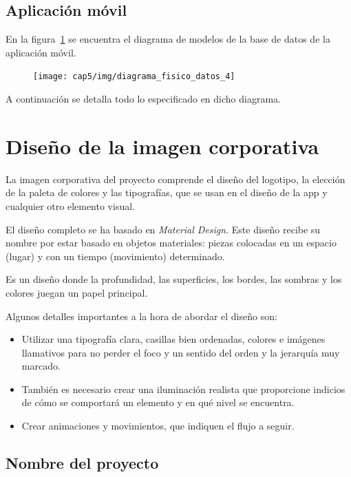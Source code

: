 \subsection{Aplicación móvil}

En la figura~\ref{fig:diagrama-fisico-datos-4} se encuentra el diagrama de
modelos de la base de datos de la aplicación móvil.


\begin{figure}[htbp]
  \centering
  \texttt{[image: cap5/img/diagrama\_fisico\_datos\_4]}
  \caption{}
  \label{fig:diagrama-fisico-datos-4}
\end{figure}

A continuación se detalla todo lo especificado en dicho diagrama.


\section{Diseño de la imagen corporativa}

La imagen corporativa del proyecto comprende el diseño del logotipo, la elección
de la paleta de colores y las tipografías, que se usan en el diseño de la app y
cualquier otro elemento visual.

El diseño completo se ha basado en
\textit{Material Design}.\cite{material-design} Este diseño recibe su nombre por
estar basado en objetos materiales: piezas colocadas en un espacio (lugar) y con
un tiempo (movimiento) determinado.

Es un diseño donde la profundidad, las superficies, los bordes, las sombras y
los colores juegan un papel principal.

Algunos detalles importantes a la hora de abordar el diseño son:
\begin{itemize}
\item Utilizar una tipografía clara, casillas bien ordenadas, colores e
  imágenes llamativos para no perder el foco y un sentido del orden y la
  jerarquía muy marcado.
\item También es necesario crear una iluminación realista que proporcione
  indicios de cómo se comportará un elemento y en qué nivel se encuentra.
\item Crear animaciones y movimientos, que indiquen el flujo a seguir.
\end{itemize}


\subsection{Nombre del proyecto}

